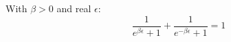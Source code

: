 \documentclass{article}
\begin{document}
With $\beta>0$ and real $\epsilon$:
\begin{equation}
\frac{1}{e^{\beta\epsilon}+1} + \frac{1}{e^{-\beta\epsilon}+1} = 1 %
\label{eq:x}
\end{equation}
\end{document}
